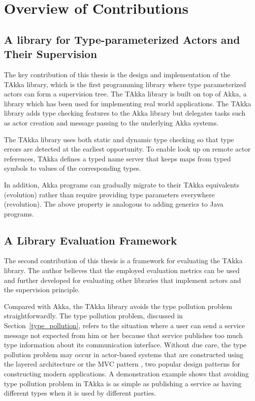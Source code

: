 \section{Overview of Contributions}


\subsection{A library for Type-parameterized Actors and Their Supervision}

The key contribution of this thesis is the design and implementation of the 
TAkka library, which is the first programming library where type parameterized 
actors can form a supervision tree.  The TAkka library is built on top of Akka, 
a library which has been used for implementing real world applications.  The 
TAkka library adds type checking features to the Akka library but
delegates tasks such as actor creation and message passing to the underlying
Akka systems. 

The TAkka library uses both static and dynamic type checking so that type 
errors are detected at the earliest opportunity. To enable look up on remote 
actor references, TAkka defines a typed name server that keeps maps from typed 
symbols to values of the corresponding types.

In addition, Akka  programs can gradually migrate to their TAkka equivalents 
(evolution) rather than require providing type parameters everywhere 
(revolution).  The above property is analogous to adding generics to Java 
programs.
  
\subsection{A Library Evaluation Framework}

The second contribution of this thesis is a framework for evaluating the 
TAkka library.  The author believes that the employed evaluation metrics can be 
used and further developed for evaluating other libraries that implement actors 
and the supervision principle.

Compared with Akka, the TAkka library avoids the type pollution 
problem straightforwardly.  The type pollution problem, discussed in 
Section~\ref{type_pollution}, refers to the situation where a user can send a 
service message not expected from him or her because that service publishes too 
much type information about its communication interface. Without due care, 
the type pollution problem may occur in actor-based systems that are 
constructed using the layered architecture \citep{DijkstraTHE, 
buschmann2007pattern} or the MVC pattern \citep{reenskaug1979original, 
reenskaug2003model}, two popular design patterns for constructing modern 
applications.  A demonstration example shows that avoiding type 
pollution problem in TAkka is as simple as publishing a service as having 
different types when it is used by different parties.

